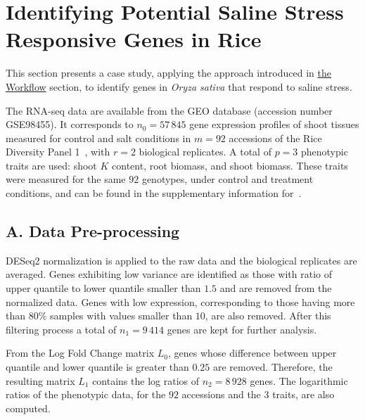 \section*{Identifying Potential Saline Stress Responsive Genes in Rice}
\label{sec.case}

This section presents a case study, applying the approach introduced in 
\hyperref[sec.framework]{the Workflow} section, to identify genes in
\textit{Oryza sativa} that respond to saline stress.
\vspace{0.5cm}

The RNA-seq data are available from the
GEO database \cite{clough2016gene} (accession
number GSE98455). It corresponds to $n_0=57\,845$ gene
expression profiles of shoot tissues measured for control and
salt conditions in $m=92$ accessions of the Rice Diversity Panel 1~\cite{eizenga2014registration},
with $r=2$ biological replicates. A total of $p=3 $ phenotypic traits
are used: shoot $K$ content, root biomass, and shoot biomass. These
traits were measured for the same $92$ genotypes, under control and
treatment conditions, and can be found in the supplementary
information for~\cite{campbell2017allelic}.

\subsection*{A. Data Pre-processing}

DESeq2 normalization is applied to the raw data and the biological
replicates are averaged. Genes exhibiting low variance are
identified as those with ratio of upper quantile to lower quantile
smaller than $1.5$ and are removed from the normalized data. Genes
with low expression, corresponding to those having more than $80\%$
samples with values smaller than $10$, are also removed. After this
filtering process a total of $n_1 = 9\,414$ genes are kept for further analysis.
\vspace{0.5cm}

From the Log Fold Change matrix $L_0$, genes whose difference between
upper quantile and lower quantile is greater than $0.25$ are
removed. Therefore, the resulting matrix $L_1$ contains the log ratios
of $n_2 = 8\,928$ genes. The logarithmic ratios of the phenotypic data,
for the $92$ accessions and the $3$ traits, are also computed.

